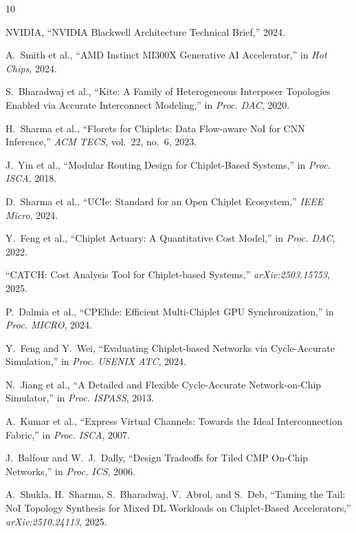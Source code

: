\documentclass[conference]{IEEEtran}
\begin{document}
\balance

\begin{thebibliography}{10}

NVIDIA, ``NVIDIA Blackwell Architecture Technical Brief,'' 2024.

A.~Smith et al., ``AMD Instinct MI300X Generative AI Accelerator,'' in \textit{Hot Chips}, 2024.

S.~Bharadwaj et al., ``Kite: A Family of Heterogeneous Interposer Topologies Enabled via Accurate Interconnect Modeling,'' in \textit{Proc. DAC}, 2020.

H.~Sharma et al., ``Florets for Chiplets: Data Flow-aware NoI for CNN Inference,'' \textit{ACM TECS}, vol.~22, no.~6, 2023.

J.~Yin et al., ``Modular Routing Design for Chiplet-Based Systems,'' in \textit{Proc. ISCA}, 2018.

D.~Sharma et al., ``UCIe: Standard for an Open Chiplet Ecosystem,'' \textit{IEEE Micro}, 2024.

Y.~Feng et al., ``Chiplet Actuary: A Quantitative Cost Model,'' in \textit{Proc. DAC}, 2022.

``CATCH: Cost Analysis Tool for Chiplet-based Systems,'' \textit{arXiv:2503.15753}, 2025.

P.~Dalmia et al., ``CPElide: Efficient Multi-Chiplet GPU Synchronization,'' in \textit{Proc. MICRO}, 2024.

Y.~Feng and Y.~Wei, ``Evaluating Chiplet-based Networks via Cycle-Accurate Simulation,'' in \textit{Proc. USENIX ATC}, 2024.

N.~Jiang et al., ``A Detailed and Flexible Cycle-Accurate Network-on-Chip Simulator,'' in \textit{Proc. ISPASS}, 2013.

A.~Kumar et al., ``Express Virtual Channels: Towards the Ideal Interconnection Fabric,'' in \textit{Proc. ISCA}, 2007.

J.~Balfour and W.~J.~Dally, ``Design Tradeoffs for Tiled CMP On-Chip Networks,'' in \textit{Proc. ICS}, 2006.

A.~Shukla, H.~Sharma, S.~Bharadwaj, V.~Abrol, and S.~Deb, ``Taming the Tail: NoI Topology Synthesis for Mixed DL Workloads on Chiplet-Based Accelerators,'' \textit{arXiv:2510.24113}, 2025.


\end{thebibliography}
\end{document}
